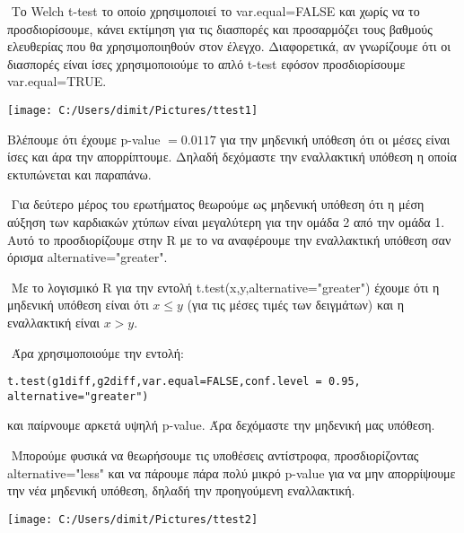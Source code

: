 \documentclass[oneside,a4paper]{article}
\newcommand {\tl}{\textlatin}
\begin{document}
\begin{enumerate}
    $ $\newline
    Το \tl{Welch t-test} το οποίο χρησιμοποιεί το \tl{var.equal=FALSE} και χωρίς να το προσδιορίσουμε, κάνει εκτίμηση για τις διασπορές και προσαρμόζει τους βαθμούς ελευθερίας που θα χρησιμοποιηθούν στον έλεγχο. Διαφορετικά, αν γνωρίζουμε ότι οι διασπορές είναι ίσες χρησιμοποιούμε το απλό \tl{t-test} εφόσον προσδιορίσουμε \tl{var.equal=TRUE}.
     

    \begin{center}
    \texttt{[image: C:/Users/dimit/Pictures/ttest1]}
    \end{center} 

    Βλέπουμε ότι έχουμε \tl{p-value} $= 0.0117$ για την μηδενική υπόθεση ότι οι μέσες είναι ίσες και άρα την απορρίπτουμε. Δηλαδή δεχόμαστε την εναλλακτική υπόθεση η οποία εκτυπώνεται και παραπάνω.

    $ $\newline
Για δεύτερο μέρος του ερωτήματος θεωρούμε ως μηδενική υπόθεση ότι η μέση αύξηση των καρδιακών χτύπων είναι μεγαλύτερη για την ομάδα 2 από την ομάδα 1. Αυτό το προσδιορίζουμε στην \tl{R} με το να αναφέρουμε την εναλλακτική υπόθεση σαν όρισμα \tl{alternative="greater"}.

$ $\newline
Με το λογισμικό \tl{R} για την εντολή \tl{t.test(x,y,alternative="greater")} έχουμε ότι η μηδενική υπόθεση είναι ότι $x \leq y$ (για τις μέσες τιμές των δειγμάτων) και η εναλλακτική είναι $x>y$.

$ $\newline
Άρα χρησιμοποιούμε την εντολή:
\vspace{0.1cm}
    {
    \begin{lstlisting}
t.test(g1diff,g2diff,var.equal=FALSE,conf.level = 0.95,
alternative="greater")
\end{lstlisting}}
\vspace{0.1cm}

και παίρνουμε αρκετά υψηλή \tl{p-value}. Άρα δεχόμαστε την μηδενική μας υπόθεση.

$ $\newline
Μπορούμε φυσικά να θεωρήσουμε τις υποθέσεις αντίστροφα, προσδιορίζοντας \tl{alternative="less"} και να πάρουμε πάρα πολύ μικρό \tl{p-value} για να μην απορρίψουμε την νέα μηδενική υπόθεση, δηλαδή την προηγούμενη εναλλακτική. 

\begin{center}
    \texttt{[image: C:/Users/dimit/Pictures/ttest2]}
    \end{center}




\end{enumerate}
\end{document}
